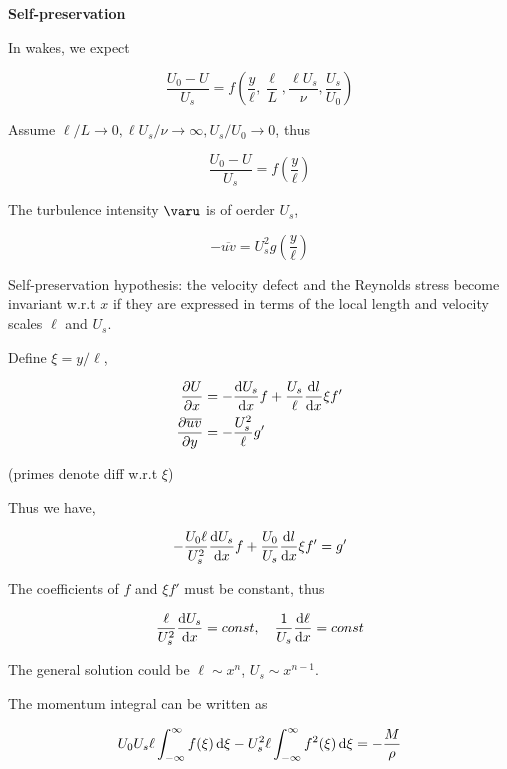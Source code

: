 \documentclass{article}
\begin{document}
\textbf{Self-preservation}

In wakes, we expect

\begin{equation*}
    \frac{U_0-U}{U_s}=f(\frac{y}{\ell},\frac{\ell}{L},\frac{\ell U_s}{\nu},\frac{U_s}{U_0})
\end{equation*}

Assume $\ell/L\rightarrow0, \ell U_s/\nu\rightarrow\infty, U_s/U_0\rightarrow0$, thus

\begin{equation*}
    \frac{U_0-U}{U_s}=f\left(\frac{y}{\ell}\right)
\end{equation*}

The turbulence intensity $\varu$ is of oerder $U_s$,

\begin{equation*}
    -\overline{uv}=U_s^2g\left(\frac{y}{\ell}\right)
\end{equation*}

Self-preservation hypothesis: the velocity defect and the Reynolds stress become invariant w.r.t $x$ if they are expressed in terms of the local length and velocity scales $\ell$ and $U_s$.

Define $\xi=y/\ell$,

\begin{align*}
    \frac{\p U}{\p x}&=-\frac{\dif U_s}{\dx}f+\frac{U_s}{\ell}\frac{\dif l}{\dx}\xi f'\\
    \frac{\p\overline{uv}}{\p y}&=-\frac{U_s^2}{\ell}g'
\end{align*}

(primes denote diff w.r.t $\xi$)

Thus we have,

\begin{equation*}
    -\frac{U_0\ell}{U_s^2}\frac{\mathop{}\!\mathrm{d} U_s}{\mathop{}\!\mathrm{d}x}f+\frac{U_0}{U_s}\frac{\mathop{}\!\mathrm{d} l}{\mathop{}\!\mathrm{d}x}\xi f'=g'
\end{equation*}

The coefficients of $f$ and $\xi f'$ must be constant, thus

\begin{equation*}
    \frac{\ell}{U_s^2}\frac{\mathop{}\!\mathrm{d} U_s}{\mathop{}\!\mathrm{d}x}=const,\quad\frac{1}{U_s}\frac{\mathop{}\!\mathrm{d} \ell}{\mathop{}\!\mathrm{d}x}=const
\end{equation*}

The general solution could be $\ell\sim x^n$, $U_s\sim x^{n-1}$.

The momentum integral can be written as

\begin{equation*}
    U_0U_s\ell\int_{-\infty}^{\infty}f(\xi)\mathop{}\!\mathrm{d}\xi-U_s^2\ell\int_{-\infty}^{\infty}f^2(\xi)\mathop{}\!\mathrm{d}\xi=-\frac{M}{\rho}
\end{equation*}
\end{document}
